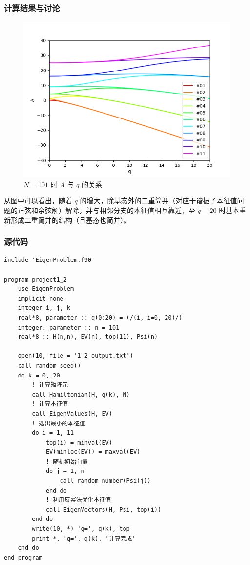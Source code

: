 \documentclass{ctexart}
\begin{document}
\subsubsection{计算结果与讨论}
\begin{figure}[h]
\centering
\includegraphics[scale=0.7]{101_qa.png}
\caption{$N=101$ 时 $A$ 与 $q$ 的关系}
\end{figure}

从图中可以看出，随着 $q$ 的增大，除基态外的二重简并（对应于谐振子本征值问题的正弦和余弦解）解除，并与相邻分支的本征值相互靠近，至 $q=20$ 时基本重新形成二重简并的结构（且基态也简并）。

\subsubsection{源代码}
\begin{lstlisting}
include 'EigenProblem.f90' 

program project1_2
    use EigenProblem
    implicit none
    integer i, j, k
    real*8, parameter :: q(0:20) = (/(i, i=0, 20)/)
    integer, parameter :: n = 101
    real*8 :: H(n,n), EV(n), top(11), Psi(n)

    open(10, file = '1_2_output.txt')
    call random_seed()
    do k = 0, 20
        ! 计算矩阵元
        call Hamiltonian(H, q(k), N)
        ! 计算本征值
        call EigenValues(H, EV)
        ! 选出最小的本征值
        do i = 1, 11
            top(i) = minval(EV)
            EV(minloc(EV)) = maxval(EV)
            ! 随机初始向量
            do j = 1, n
                call random_number(Psi(j))
            end do
            ! 利用反幂法优化本征值
            call EigenVectors(H, Psi, top(i))
        end do
        write(10, *) 'q=', q(k), top
        print *, 'q=', q(k), '计算完成'
    end do
end program
\end{lstlisting}
\end{document}
